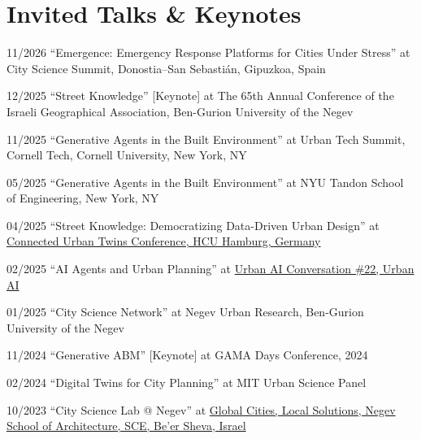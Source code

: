 \section*{Invited Talks \& Keynotes}

\begin{tablist}

    \item[11/2026] \tab \enquote{Emergence: Emergency Response Platforms for Cities Under Stress} at
    {City Science Summit, Donostia--San Sebastián, Gipuzkoa, Spain}

    \item[12/2025] \tab \enquote{Street Knowledge} [Keynote] at
    {The 65th Annual Conference of the Israeli Geographical Association, Ben-Gurion University of the Negev}

    \item[11/2025] \tab \enquote{Generative Agents in the Built Environment} at
    {Urban Tech Summit, Cornell Tech, Cornell University, New York, NY}

    \item[05/2025] \tab \enquote{Generative Agents in the Built Environment} at
    {NYU Tandon School of Engineering, New York, NY}

    \item[04/2025] \tab \enquote{Street Knowledge: Democratizing Data-Driven Urban Design} at
    \href{https://www.youtube.com/watch?v=EzzsXhp_lig}{Connected Urban Twins Conference, HCU Hamburg, Germany}

    \item[02/2025] \tab \enquote{AI Agents and Urban Planning} at
    \href{https://www.youtube.com/watch?v=1y7Oa1Kv7bI}{Urban AI Conversation \#22, Urban AI}

    \item[01/2025] \tab \enquote{City Science Network} at
    {Negev Urban Research, Ben-Gurion University of the Negev}

    \item[11/2024] \tab \enquote{Generative ABM} [Keynote] at
    {GAMA Days Conference, 2024}

    \item[02/2024] \tab \enquote{Digital Twins for City Planning} at
    {MIT Urban Science Panel}

    \item[10/2023] \tab \enquote{City Science Lab @ Negev} at
    \href{https://www.youtube.com/watch?v=Hgm2MQnYjcw}{Global Cities, Local Solutions, Negev School of Architecture, SCE, Be'er Sheva, Israel}


\end{tablist}
